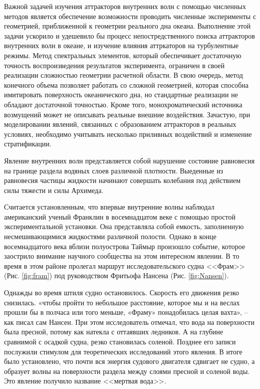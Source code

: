 \Introduction

Важной задачей изучения аттракторов внутренних волн с помощью численных методов является обеспечение возможности проводить численные эксперименты с геометрией, приближенной к геометрии реального дна океана. Выполнение этой задачи ускорило и удешевило бы процесс непостредственного поиска аттракторов внутренних волн в океане, и изучение влияния аттркаторов на турбулентные режимы. Метод спектральных элементов, который обеспечивает достаточную точность воспроизведения результатов эксперимента, ограничен в своей реализации сложностью геометрии расчетной области. В свою очередь, метод конечного объема позволяет работать со сложной геометрией, которая способна имитировать поверхность океанического дна, но стандартные реализации не обладают достаточной точностью. Кроме того, монохроматический источника возмущений может не описывать реальные внешние воздействия. Зачастую, при моделировании явлений, связанных с образованием аттракторов в реальных условиях, необходимо учитывать несколько приливных воздействий \cite{Garrett1972} и изменение стратификации.

Явление внутренних волн представляется собой нарушение состояние равновесия на границе раздела водяных слоев различной плотности. Выеденные из равновесия частицы жидкости начинают совершать колебания под действием силы тяжести и силы Архимеда.

Считается установленным, что впервые внутренние волны наблюдал американский ученый Франклин в восемнадцатом веке с помощью простой экспериментальной установки. Она представляла собой емкость, заполненную несмешивающимися жидкостями различной полости\cite{Sudolski}. Однако в конце восемнадцатого века вблизи полуострова Таймыр произошло событие, которое заострило внимание научного сообщества на этом интересном явлении. В то время в этом районе пролегал маршрут исследовательского судна <<Фрам>>(Рис. \ref{fig:fram}) под руководством Фритьофа Нансена (Рис. \ref{fig:Nansen}).

Однажды во время штиля судно остановилось. Скорость его движения резко снизилась.  «чтобы пройти то небольшое расстояние, которое мы и на веслах прошли бы в полчаса или того меньше, «Фраму» понадобилась целая вахта», -- как писал сам Нансен. При этом исследователь отмечал, что вода на поверхности была пресной, потому как натекла с оттаявших ледников. А на глубине сравнимой с осадкой судна, резко становилась соленой. Позднее его записи послужили стимулом для теоретических исследований этого явления. В итоге было установлено, что почти вся энергия судового двигателя сдвигает не судно, а образует волны на поверхности раздела между слоями пресной и соленой воды. Это явление получило название <<мертвая вода>>.


